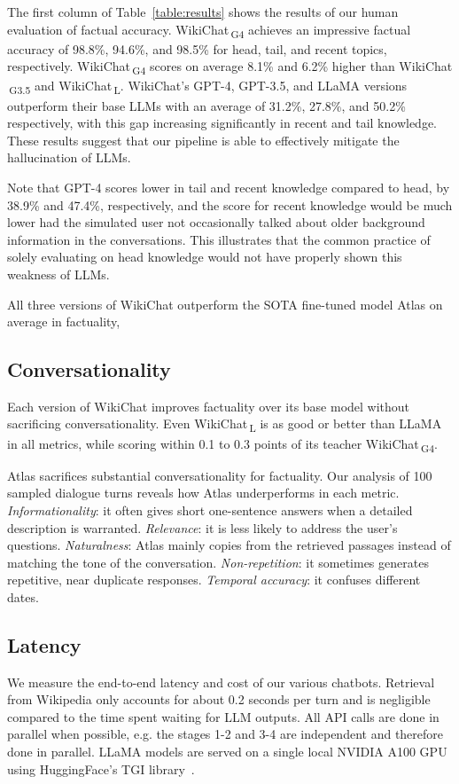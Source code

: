 \documentclass[11pt]{article}
\newcommand{\system}[0]{WikiChat\xspace}
\newcommand{\systemgt}[0]{WikiChat$\,$\textsubscript{G3.5}\xspace}
\newcommand{\systemgf}[0]{WikiChat$\,$\textsubscript{G4}\xspace}
\newcommand{\systeml}[0]{WikiChat$\,$\textsubscript{L}\xspace}
\begin{document}
The first column of Table~\ref{table:results} shows the results of our human evaluation of factual accuracy. \systemgf achieves an impressive factual accuracy of 98.8\%, 94.6\%, and 98.5\% for head, tail, and recent topics, respectively. 
\systemgf scores on average 8.1\% and 6.2\% higher than \systemgt and \systeml. \system's GPT-4, GPT-3.5, and LLaMA versions
outperform their base LLMs with an average of 31.2\%, 27.8\%, and 50.2\% respectively, with this gap increasing significantly in recent and tail knowledge. 
These results suggest that our pipeline is able to effectively mitigate the hallucination of LLMs.

Note that GPT-4 scores lower in tail and recent knowledge compared to head, by 38.9\% and 47.4\%, respectively, and the score for recent knowledge would be much lower had the simulated user not occasionally talked about older background information in the conversations. This illustrates that the common practice of solely evaluating on head knowledge would not have properly shown this weakness of LLMs. 

All three versions of \system outperform the SOTA fine-tuned model Atlas on average in factuality,

\subsection{Conversationality}

Each version of \system improves factuality over its base model without sacrificing conversationality. Even \systeml is as good or better than LLaMA in all metrics, while scoring within 0.1 to 0.3 points of its teacher \systemgf.

Atlas sacrifices substantial conversationality for factuality.
Our analysis of 100 sampled dialogue turns reveals how Atlas underperforms in each metric. {\em Informationality}: it often gives short one-sentence answers when a detailed description is warranted. {\em Relevance}: it is less likely to address the user's questions. {\em Naturalness}: Atlas mainly copies from the retrieved passages instead of matching the tone of the conversation. {\em Non-repetition}: it sometimes generates repetitive, near duplicate responses. {\em Temporal accuracy}: it confuses different dates.

\subsection{Latency}
We measure the end-to-end latency and cost of our various chatbots. Retrieval from Wikipedia only accounts for about 0.2 seconds per turn and is negligible compared to the time spent waiting for LLM outputs. All API calls are done in parallel when possible, e.g. the stages 1-2 and 3-4 are independent and therefore done in parallel. LLaMA models are served on a single local NVIDIA A100 GPU using HuggingFace's TGI library~\cite{huggingface-tgi}.
\end{document}
